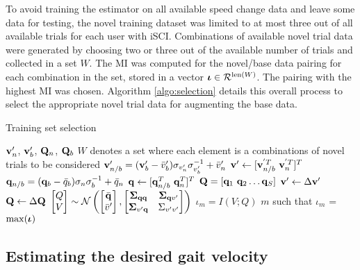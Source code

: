 To avoid training the estimator on all available speed change data and leave some data for testing, the novel training dataset was limited to at most three out of all available trials for each user with iSCI. Combinations of available novel trial data were generated by choosing two or three out of the available number of trials and collected in a set $ W $. The MI was computed for the novel/base data pairing for each combination in the set, stored in a vector $ \boldsymbol{\iota} \in \mathcal{R}^{{\rm len}(W)}$. The pairing with the highest MI was chosen. Algorithm \ref{algo:selection} details this overall process to select the appropriate novel trial data for augmenting the base data.

\begin{algorithm}
	\caption{Training set selection}\label{algo:selection}
	\begin{algorithmic}[1]
		\Require $ \mathbf{v}'_n$, $\mathbf{v}'_b $, $ \mathbf{Q}_n $, $\mathbf{Q}_b$
		 $ W $ denotes a set where each element is a combinations of novel trials to be considered
		\State $ \mathbf{v}'_{n/b} = (\mathbf{v}'_b - \bar{v}'_b)\sigma_{v'_n} \sigma_{v'_b}^{-1} + \bar{v}'_n $ 
		\State $ \v' \leftarrow [\v_{n/b}^{'T}\ \v_{n}^{'T}]^T $
		\State $ \mathbf{q}_{n/b} = (\mathbf{q}_b - \bar{q}_b)\sigma_n \sigma_b^{-1} + \bar{q}_n $ 
		\State $ \mathbf{q} \leftarrow [\mathbf{q}_{n/b}^T\ \mathbf{q}_{n}^T]^T $
		\EndFor
		\State $ \mathbf{Q} = [\mathbf{q}_1 \ \mathbf{q}_2 \dots \mathbf{q}_S] $
		\State $ \mathbf{v}' \leftarrow \Delta \mathbf{v}' $
		\State $ \mathbf{Q} \leftarrow \Delta \mathbf{Q} $
		\vskip 5pt
		\State $ \begin{bmatrix}
			Q \\
			V
		\end{bmatrix} \sim \mathcal{N} \left( \begin{bmatrix}
			\bar{\mathbf{q}} \\
			\bar{v}'
		\end{bmatrix},\begin{bmatrix}
			\boldsymbol{\Sigma}_{\mathbf{q} \mathbf{q}} & \boldsymbol{\Sigma}_{\mathbf{q} v'} \\
			\boldsymbol{\Sigma}_{v' \mathbf{q}} & \Sigma_{v'v'}
		\end{bmatrix}\right) $
		\vskip 2pt
		\State $ \iota_m = I(V;Q) $
		\EndFor
		\State \Return $m$ such that $\iota_m$ = $ \max(\boldsymbol{\iota}) $ 
	\end{algorithmic}
\end{algorithm}%

\subsection{Estimating the desired gait velocity}\label{sec:models}

